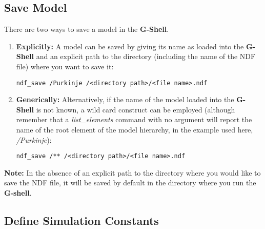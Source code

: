 \documentclass[12pt]{article}
\begin{document}
\subsection*{Save Model}

There are two ways to save a model in the {\bf G-Shell}.

\begin{enumerate}
   \item{\bf Explicitly:} A model can be saved by giving its name as loaded into the {\bf G-Shell} and an explicit path to the directory (including the name of the NDF file) where you want to save it:
   \begin{verbatim}
ndf_save /Purkinje /<directory path>/<file name>.ndf
   \end{verbatim}
   \item{\bf Generically:} Alternatively, if the name of the model loaded into the {\bf G-Shell} is not known, a wild card construct can be employed (although remember that a {\it list\_elements} command with no argument will report the name of the root element of the model hierarchy, in the example used here, {\it /Purkinje}):
   \begin{verbatim}
ndf_save /** /<directory path>/<file name>.ndf
   \end{verbatim}   
\end{enumerate}
{\bf Note:} In the absence of an explicit path to the directory where you would like to save the NDF file, it will be saved by default in the directory where you run the {\bf G-shell}.

\subsection*{Define Simulation Constants}
\end{document}
